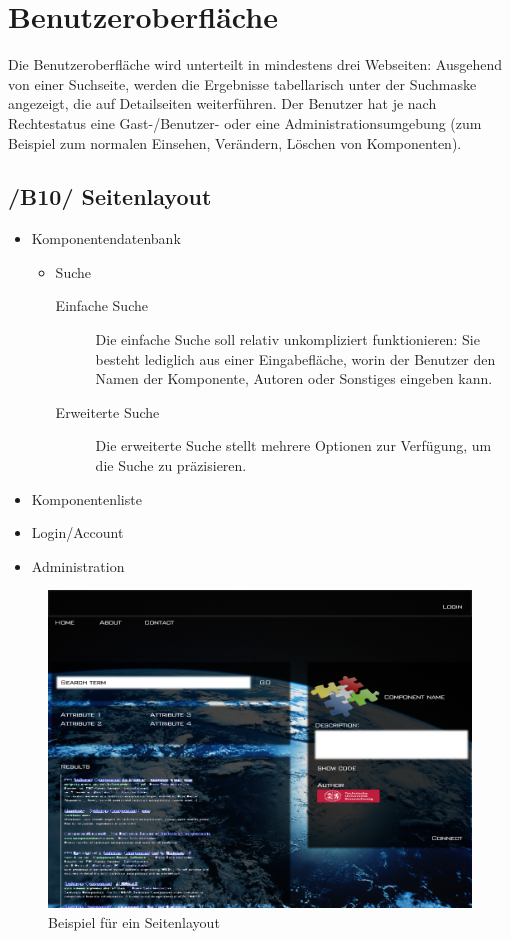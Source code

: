 

\chapter{Benutzeroberfläche}

Die Benutzeroberfläche wird unterteilt in mindestens drei Webseiten:
Ausgehend von einer Suchseite, werden die Ergebnisse tabellarisch unter der
Suchmaske angezeigt, die auf Detailseiten weiterführen. 
Der Benutzer hat je nach Rechtestatus eine Gast-/Benutzer- oder eine Administrationsumgebung (zum Beispiel zum normalen Einsehen, Verändern, Löschen von Komponenten). 

\section{/B10/ Seitenlayout}

 \begin{itemize}
   \item Komponentendatenbank
   \begin{itemize}
    \item Suche
      \begin{description}
       \item[Einfache Suche] Die einfache Suche soll relativ unkompliziert funktionieren:
        Sie besteht lediglich aus einer Eingabefläche, worin der Benutzer
       den Namen der Komponente, Autoren oder Sonstiges eingeben kann. 
       \item[Erweiterte Suche] Die erweiterte Suche stellt mehrere Optionen zur Verfügung, um die Suche zu präzisieren. 
       \end{description}
    \end{itemize}
    \item Komponentenliste
    \item Login/Account
    \item Administration
 \end{itemize}
 
\begin{figure}
\includegraphics[width=0.8\linewidth]{bilder/overview.jpg}
\caption{Beispiel für ein Seitenlayout}
\label{fig:gui}
\end{figure}

